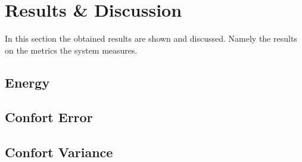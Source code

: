 \section{Results \& Discussion}


In this section the obtained results are shown and discussed. Namely the results on the metrics the system measures.


\subsection{Energy}


\subsection{Confort Error}


\subsection{Confort Variance}
